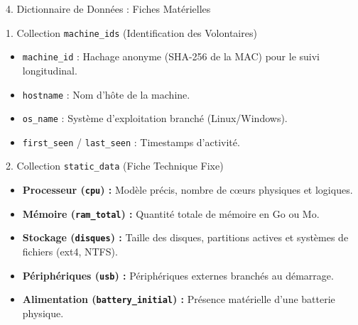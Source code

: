 \documentclass[10pt,aspectratio=169]{beamer}
\begin{document}
\begin{frame}{4. Dictionnaire de Données : Fiches Matérielles}
  \begin{block}{1. Collection \texttt{machine\_ids} (Identification des Volontaires)}
    \begin{itemize}
      \item \texttt{machine\_id} : Hachage anonyme (SHA-256 de la MAC) pour le suivi longitudinal.
      \item \texttt{hostname} : Nom d'hôte de la machine.
      \item \texttt{os\_name} : Système d'exploitation branché (Linux/Windows).
      \item \texttt{first\_seen} / \texttt{last\_seen} : Timestamps d'activité.
    \end{itemize}
  \end{block}
  
  \begin{block}{2. Collection \texttt{static\_data} (Fiche Technique Fixe)}
    \begin{itemize}
      \item \textbf{Processeur (\texttt{cpu}) :} Modèle précis, nombre de cœurs physiques et logiques.
      \item \textbf{Mémoire (\texttt{ram\_total}) :} Quantité totale de mémoire en Go ou Mo.
      \item \textbf{Stockage (\texttt{disques}) :} Taille des disques, partitions actives et systèmes de fichiers (ext4, NTFS).
      \item \textbf{Périphériques (\texttt{usb}) :} Périphériques externes branchés au démarrage.
      \item \textbf{Alimentation (\texttt{battery\_initial}) :} Présence matérielle d'une batterie physique.
    \end{itemize}
  \end{block}
\end{frame}
\end{document}
